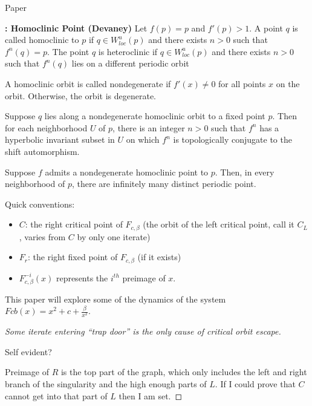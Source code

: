 \documentclass[12pt]{report}
\newenvironment{myproof}[1][\proofname]{%
  \begin{proof}[#1]$ $\par\nobreak\ignorespaces
}{%
  \end{proof}
}
\newcommand{\Fcb}{F_{c, \beta}}
\begin{document}
\begin{center}
	Paper 
\end{center}

\begin{definition}{\textbf{: Homoclinic Point (Devaney)}}
	Let $f (p) = p$ and $f' (p) > 1$. A point $q$ is called homoclinic to $p$ if $q \in W^u_{loc} (p)$ and there exists $n> 0$ such that $f^n (q) = p$. The point $q$ is heteroclinic if $q \in W^u_{loc} (p)$ and there exists $n > 0$ such that $f^n (q)$ lies on a different periodic orbit
\end{definition}

\begin{definition}
	A homoclinic orbit is called nondegenerate if $f' (x)\neq 0$ for all points $x$ on the orbit. Otherwise, the orbit is degenerate.
\end{definition}

\begin{theorem}
Suppose $q$ lies along a nondegenerate homoclinic orbit to a fixed point $p$. Then  for each neighborhood $U$ of $p$, there is an integer $n>0$ such that $f^n$ has a hyperbolic invariant subset in $U$ on which $f^n$ is topologically conjugate to the shift automorphism.
\end{theorem}

\begin{theorem}
Suppose $f$ admits a nondegenerate homoclinic point to $p$. Then, in every neighborhood of $p$, there are infinitely many distinct periodic point.
\end{theorem}

Quick conventions:
\begin{itemize}
	\item $C$: the right critical point of $\Fcb$ (the orbit of the left critical point, call it $C_L$, varies from $C$ by only one iterate)
	\item $F_r$: the right fixed point of $\Fcb$ (if it exists)
	\item $\Fcb^{-i} (x)$ represents the $i^{th}$ preimage of $x$.
\end{itemize}

This paper will explore some of the dynamics of the system $Fcb (x) = x^2 + c + \frac{\beta}{x^2}$.

\begin{myproof}[Some iterate entering ``trap door'' is the only cause of critical orbit escape]
Self evident?

Preimage of $R$ is the top part of the graph, which only includes the left and right branch of the singularity and the high enough parts of $L$. If I could prove that $C$ cannot get into that part of $L$ then I am set.
\end{myproof}
\end{document}
